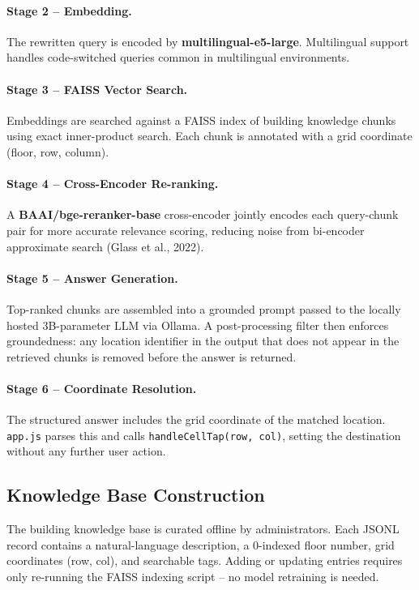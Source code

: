 \documentclass[12pt,a4paper]{article}
\begin{document}
\paragraph{Stage 2 -- Embedding.}
The rewritten query is encoded by \textbf{multilingual-e5-large}. Multilingual
support handles code-switched queries common in multilingual environments.

\paragraph{Stage 3 -- FAISS Vector Search.}
Embeddings are searched against a FAISS index of building knowledge chunks using
exact inner-product search. Each chunk is annotated with a grid coordinate
(floor, row, column).

\paragraph{Stage 4 -- Cross-Encoder Re-ranking.}
A \textbf{BAAI/bge-reranker-base} cross-encoder jointly encodes each
query-chunk pair for more accurate relevance scoring, reducing noise from
bi-encoder approximate search (Glass et al., 2022).

\paragraph{Stage 5 -- Answer Generation.}
Top-ranked chunks are assembled into a grounded prompt passed to the locally
hosted 3B-parameter LLM via Ollama. A post-processing filter then enforces
groundedness: any location identifier in the output that does not appear in the
retrieved chunks is removed before the answer is returned.

\paragraph{Stage 6 -- Coordinate Resolution.}
The structured answer includes the grid coordinate of the matched location.
\texttt{app.js} parses this and calls \texttt{handleCellTap(row, col)}, setting
the destination without any further user action.

\subsection{Knowledge Base Construction}

The building knowledge base is curated offline by administrators. Each JSONL
record contains a natural-language description, a 0-indexed floor number, grid
coordinates (row, col), and searchable tags. Adding or updating entries requires
only re-running the FAISS indexing script -- no model retraining is needed.
\end{document}
